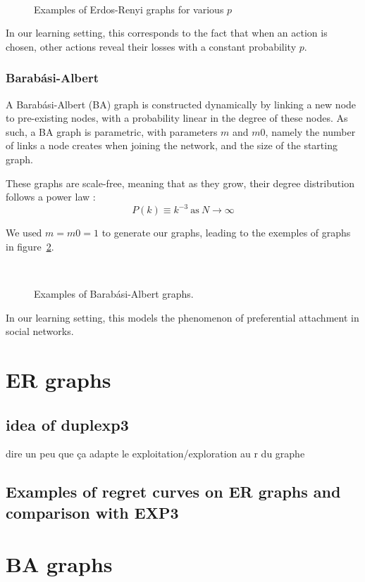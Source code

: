 \documentclass[10pt,a4paper]{scrartcl}
\begin{document}
\begin{figure}
 ~
 \label{er_ex}
 \caption{Examples of Erdos-Renyi graphs for various $p$}
\end{figure}

In our learning setting, this corresponds to the fact that when an action is chosen, other actions reveal their losses with a constant probability $p$.

\subsubsection{Barabási-Albert}
A Barabási-Albert (BA) graph is constructed dynamically by linking a new node to pre-existing nodes, with a probability linear in the degree of these nodes. As such, a BA graph is parametric, with parameters $m$ and $m0$, namely the number of links a node creates when joining the network, and the size of the starting graph.

These graphs are scale-free, meaning that as they grow, their degree distribution follows a power law :
$$P(k) \equiv k^{-3}~\text{as}~N\rightarrow \infty$$

We used $m=m0=1$ to generate our graphs, leading to the exemples of graphs in figure~\ref{ba_ex}.

\begin{figure}
 ~
 \label{ba_ex}
 \caption{Examples of Barabási-Albert graphs.}
\end{figure}

In our learning setting, this models the phenomenon of preferential attachment in social networks.

\section{ER graphs}
\subsection{idea of duplexp3}
dire un peu que ça adapte le exploitation/exploration au r du graphe

\subsection{Examples of regret curves on ER graphs and comparison with EXP3}

\section{BA graphs}
\end{document}
